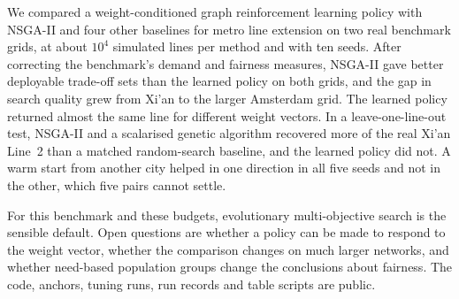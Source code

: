 We compared a weight-conditioned graph reinforcement learning policy with NSGA-II and four other baselines for metro line extension on two real benchmark grids, at about $10^4$ simulated lines per method and with ten seeds. After correcting the benchmark's demand and fairness measures, NSGA-II gave better deployable trade-off sets than the learned policy on both grids, and the gap in search quality grew from Xi'an to the larger Amsterdam grid. The learned policy returned almost the same line for different weight vectors. In a leave-one-line-out test, NSGA-II and a scalarised genetic algorithm recovered more of the real Xi'an Line~2 than a matched random-search baseline, and the learned policy did not. A warm start from another city helped in one direction in all five seeds and not in the other, which five pairs cannot settle.

For this benchmark and these budgets, evolutionary multi-objective search is the sensible default. Open questions are whether a policy can be made to respond to the weight vector, whether the comparison changes on much larger networks, and whether need-based population groups change the conclusions about fairness. The code, anchors, tuning runs, run records and table scripts are public.
